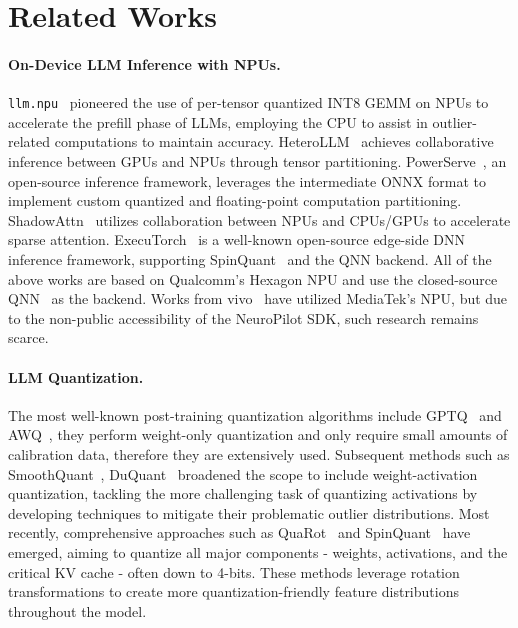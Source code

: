 \section{Related Works}


\paragraph{On-Device LLM Inference with NPUs.} \texttt{llm.npu}~\cite{mllm-npu} pioneered the use of per-tensor quantized INT8 GEMM on NPUs to accelerate the prefill phase of LLMs, employing the CPU to assist in outlier-related computations to maintain accuracy. HeteroLLM~\cite{heterollm} achieves collaborative inference between GPUs and NPUs through tensor partitioning. PowerServe~\cite{powerserve}, an open-source inference framework, leverages the intermediate ONNX format to implement custom quantized and floating-point computation partitioning. ShadowAttn~\cite{shadowattn} utilizes collaboration between NPUs and CPUs/GPUs to accelerate sparse attention. ExecuTorch~\cite{executorch,torchao} is a well-known open-source edge-side DNN inference framework, supporting SpinQuant~\cite{spinquant} and the QNN backend. All of the above works are based on Qualcomm’s Hexagon NPU and use the closed-source QNN~\cite{qualcomm-qnn} as the backend. Works from vivo~\cite{bluelm,edgeinfinite} have utilized MediaTek’s NPU, but due to the non-public accessibility of the NeuroPilot SDK, such research remains scarce.

\paragraph{LLM Quantization.} The most well-known post-training quantization algorithms include GPTQ~\cite{gptq} and AWQ~\cite{awq}, they perform weight-only quantization and only require small amounts of calibration data, therefore they are extensively used. Subsequent methods such as SmoothQuant~\cite{smoothquant}, DuQuant~\cite{duquant} broadened the scope to include weight-activation quantization, tackling the more challenging task of quantizing activations by developing techniques to mitigate their problematic outlier distributions. Most recently, comprehensive approaches such as QuaRot~\cite{quarot} and SpinQuant~\cite{spinquant} have emerged, aiming to quantize all major components - weights, activations, and the critical KV cache - often down to 4-bits. These methods leverage rotation transformations to create more quantization-friendly feature distributions throughout the model.

